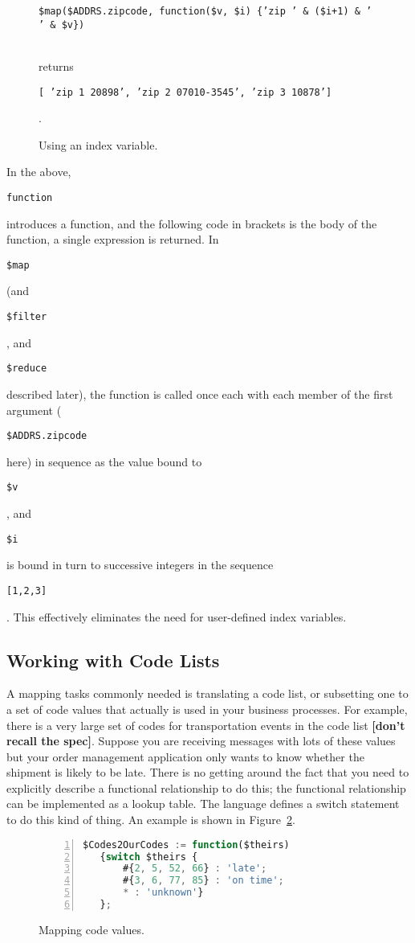 \documentclass[9pt,letterpaper]{article}
\newcommand{\stt}[1]{\begin{footnotesize}\texttt{#1}\end{footnotesize}}
\begin{document}
\begin{figure}[H]
    \caption{Using an index variable.}
    \label{code:index-in-map}
\vspace{3mm}
    \stt{\$map(\$ADDRS.zipcode, function(\$v, \$i) \{'zip ' \& (\$i+1) \& ' ' \& \$v\})}\\
\vspace{3mm}
returns \\
 \stt{[ 'zip 1 20898', 'zip 2 07010-3545', 'zip 3 10878']}.
\end{figure}

In the above, \stt{function} introduces a function, and the following code in brackets is the body of the function, a single expression is returned.
In \stt{\$map} (and \stt{\$filter}, and \stt{\$reduce} described later), the function is called once each with each member of the first argument (\stt{\$ADDRS.zipcode} here) in sequence
as the value bound to \stt{\$v}, and \stt{\$i} is bound in turn to successive integers in the sequence \stt{[1,2,3]}.
This effectively eliminates the need for user-defined index variables.

\subsection{Working with Code Lists}

A mapping tasks commonly needed is translating a code list, or subsetting one to a set of code values that actually is used in your business processes.
For example, there is a very large set of codes for transportation events in the code list \textbf{[don't recall the spec]}.
Suppose you are receiving messages with lots of these values but your order management application only wants to know whether the shipment is likely to be late.
There is no getting around the fact that you need to explicitly describe a functional relationship to do this; the functional relationship can be implemented as a lookup table.
The language defines a switch statement to do this kind of thing.
An example is shown in Figure~\ref{code:mapping-codes}.

\begin{figure}[H]
    \caption{Mapping code values.}
    \label{code:mapping-codes}
\begin{lstlisting}[language=JavaScript,numberstyle=\scriptsize,basicstyle=\ttfamily\scriptsize,numbers=left,stepnumber=1,breaklines=true]
  $Codes2OurCodes := function($theirs)
   {switch $theirs {
       #{2, 5, 52, 66} : 'late';
       #{3, 6, 77, 85} : 'on time';
       * : 'unknown'}
   };
\end{lstlisting}
\end{figure}
\end{document}
